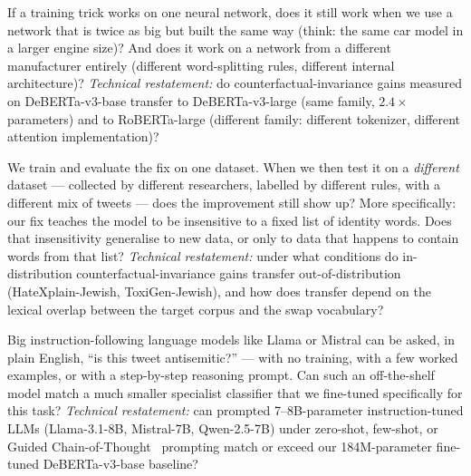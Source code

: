 \documentclass[10pt,a4paper]{article}
\begin{document}
\begin{description}[leftmargin=*,itemsep=4pt]
    \item[\textbf{RQ3 (does the fix carry over to bigger and different models? \S\ref{sec:results-id})}]
    If a training trick works on one neural network, does it still work
    when we use a network that is twice as big but built the same way
    (think: the same car model in a larger engine size)? And does it work
    on a network from a different manufacturer entirely (different
    word-splitting rules, different internal architecture)? \emph{Technical
    restatement:} do counterfactual-invariance gains measured on
    DeBERTa-v3-base transfer to DeBERTa-v3-large (same family, $2.4\times$
    parameters) and to RoBERTa-large (different family: different tokenizer,
    different attention implementation)?

    \item[\textbf{RQ4 (does the fix carry over to unfamiliar data? \S\ref{sec:results-ood})}]
    We train and evaluate the fix on one dataset. When we then test it on a
    \emph{different} dataset --- collected by different researchers,
    labelled by different rules, with a different mix of tweets --- does
    the improvement still show up? More specifically: our fix teaches the
    model to be insensitive to a fixed list of identity words. Does that
    insensitivity generalise to new data, or only to data that happens to
    contain words from that list? \emph{Technical restatement:} under what
    conditions do in-distribution counterfactual-invariance gains transfer
    out-of-distribution (HateXplain-Jewish, ToxiGen-Jewish), and how does
    transfer depend on the lexical overlap between the target corpus and
    the swap vocabulary?

    \item[\textbf{RQ5 (can a large chatbot do this job out of the box? \S\ref{sec:results-llm})}]
    Big instruction-following language models like Llama or Mistral can be
    asked, in plain English, ``is this tweet antisemitic?'' --- with no
    training, with a few worked examples, or with a step-by-step reasoning
    prompt. Can such an off-the-shelf model match a much smaller specialist
    classifier that we fine-tuned specifically for this task? \emph{Technical
    restatement:} can prompted 7--8B-parameter instruction-tuned LLMs
    (Llama-3.1-8B, Mistral-7B, Qwen-2.5-7B) under zero-shot, few-shot, or
    Guided Chain-of-Thought~\citep{patel2025evaluating} prompting match or
    exceed our 184M-parameter fine-tuned DeBERTa-v3-base baseline?
\end{description}
\end{document}
